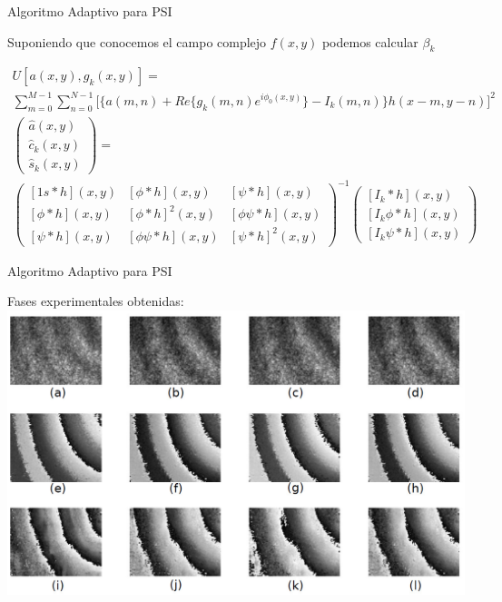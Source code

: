 \documentclass[]{beamer}
\begin{document}
\begin{frame}{Algoritmo Adaptivo para PSI}

Suponiendo que conocemos el campo complejo $f(x,y)$ podemos 
calcular $\beta_k$
\begin{center}

\begin{multline*}
U[a(x,y),g_{k}(x,y)]= \\ \sum_{m=0}^{M-1}\sum_{n=0}^{N-1}\Bigg[\{a(m,n)+Re\{g_{k}(m,
n)e^ { i\phi_{0}(x,y)}\}-I_{k}(m,n)\}h(x-m,y-n)\Bigg]^{2}
\end{multline*}
\footnotesize{
\begin{multline*}
\left(\begin{array}{c}
\hat{a}(x,y)\\
\hat{c}_{k}(x,y)\\
\hat{s}_{k}(x,y)
\end{array}\right)= \\ 
\left(\begin{array}{ccc}
[1s*h](x,y) & [\phi*h](x,y) & [\psi*h](x,y)\\{}
[\phi*h](x,y) & [\phi*h]^{2}(x,y) & [\phi\psi*h](x,y)\\{}
[\psi*h](x,y) & [\phi\psi*h](x,y) & [\psi*h]^{2}(x,y)
\end{array}\right)^{-1}
\left(\begin{array}{c}
[I_{k}*h](x,y)\\{}
[I_{k}\phi*h](x,y)\\{}
[I_{k}\psi*h](x,y)
\end{array}\right)
\end{multline*}
}

\end{center}
\end{frame}
\begin{frame}{Algoritmo Adaptivo para PSI}

Fases experimentales obtenidas:
\includegraphics[scale=0.27]{Images/faseAdaptivePSI.pdf}

\end{frame}
\end{document}
